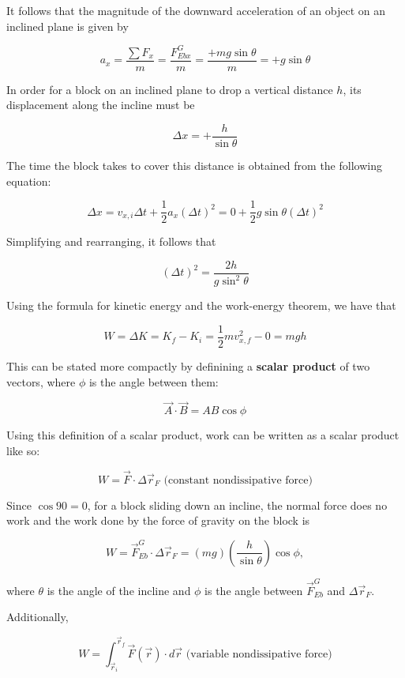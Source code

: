         It follows that the magnitude of the downward acceleration of an object on an inclined plane is given by

        \[
            a_x = \frac{\sum F_x}{m} = \frac{F^G_{Eb x}}{m} = \frac{+mg\sin{\theta}}{m} = +g\sin{\theta}
        \]

        In order for a block on an inclined plane to drop a vertical distance $h$, its displacement along the incline must be

        \[
            \Delta x = +\frac{h}{\sin{\theta}}
        \]

        The time the block takes to cover this distance is obtained from the following equation:

        \[
            \Delta x = v_{x,i} \Delta t + \frac{1}{2}a_x \left(\Delta t\right)^2 = 0 + \frac{1}{2}g\sin{\theta}\left(\Delta t\right)^2
        \]

        Simplifying and rearranging, it follows that

        \[
            \left(\Delta t\right)^2 = \frac{2h}{g\sin^2{\theta}}
        \]

        Using the formula for kinetic energy and the work-energy theorem, we have that

        \[
            W = \Delta K = K_f - K_i = \frac{1}{2}mv^2_{x,f} - 0 = mgh
        \]

        This can be stated more compactly by definining a \textbf{scalar product} of two vectors, where $\phi$ is the angle between them:

        \[
            \vec{A} \cdot \vec{B} = AB\cos{\phi}
        \]

        Using this definition of a scalar product, work can be written as a scalar product like so:

        \[
            W = \vec{F} \cdot \Delta \vec{r}_F \text{ (constant nondissipative force)}
        \]

        Since $\cos{90} = 0$, for a block sliding down an incline, the normal force does no work and the work done by the force of gravity on the block is

        \[
            W = \vec{F}^G_{Eb} \cdot \Delta \vec{r}_F = (mg)\left(\frac{h}{\sin{\theta}}\right)\cos{\phi},
        \]

        where $\theta$ is the angle of the incline and $\phi$ is the angle between $\vec{F}^G_{Eb}$ and $\Delta \vec{r}_F$.

        Additionally,

        \[
            W = \int_{\vec{r}_i}^{\vec{r}_f} \vec{F}\left(\vec{r}\right)\cdot d\vec{r} \text{ (variable nondissipative force)}
        \]

